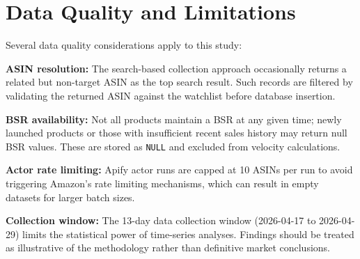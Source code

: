 \section{Data Quality and Limitations}

Several data quality considerations apply to this study:

\textbf{ASIN resolution:} The search-based collection approach occasionally returns
a related but non-target ASIN as the top search result. Such records are filtered
by validating the returned ASIN against the watchlist before database insertion.

\textbf{BSR availability:} Not all products maintain a BSR at any given time; newly
launched products or those with insufficient recent sales history may return null BSR
values. These are stored as \texttt{NULL} and excluded from velocity calculations.

\textbf{Actor rate limiting:} Apify actor runs are capped at 10 ASINs per run to
avoid triggering Amazon's rate limiting mechanisms, which can result in empty
datasets for larger batch sizes.

\textbf{Collection window:} The 13-day data collection window
(2026-04-17 to 2026-04-29) limits the statistical power of time-series
analyses. Findings should be treated as illustrative of the methodology
rather than definitive market conclusions.
